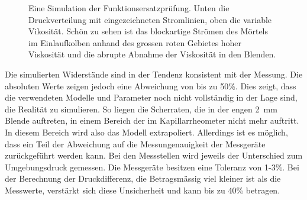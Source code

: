 \begin{figure}[htb]
    \centering
    \caption{Eine Simulation der Funktionsersatzprüfung. Unten die Druckverteilung mit eingezeichneten Stromlinien, oben die variable Vikosität. Schön zu sehen ist das blockartige Strömen des Mörtels im Einlaufkolben anhand des grossen roten Gebietes hoher Viskosität und die abrupte Abnahme der Viskosität in den Blenden.}
    \label{fig:fepSimResult}
\end{figure}

Die simulierten Widerstände sind in der Tendenz konsistent mit der Messung. Die absoluten Werte zeigen jedoch eine Abweichung von bis zu 50\%. Dies zeigt, dass die verwendeten Modelle und Parameter noch nicht vollständig in der Lage sind, die Realität zu simulieren. So liegen die Scherraten, die in der engen \SI{2}{mm} Blende auftreten, in einem Bereich der im Kapillarrheometer nicht mehr auftritt. In diesem Bereich wird also das Modell extrapoliert.
Allerdings ist es möglich, dass ein Teil der Abweichung auf die Messungenauigkeit der Messgeräte zurückgeführt werden kann. 
Bei den Messstellen wird jeweils der Unterschied zum Umgebungsdruck gemessen. Die Messgeräte besitzen eine Toleranz von 1-3\%. 
Bei der Berechnung der Druckdifferenz, die Betragsmässig viel kleiner ist als die Messwerte, verstärkt sich diese Unsicherheit und kann bis zu 40\% betragen.
%
